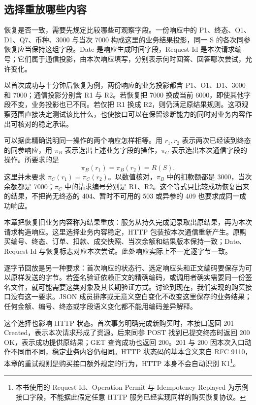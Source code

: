 \subsection*{选择重放哪些内容}

恢复是否一致，需要先规定比较哪些可观察字段。一份响应中的 P1、终态、O1、D1、Q7、币种、3000 与当次 7000 构成这里的业务结果投影，同一 S 的各次同参恢复应当保持这组字段。Date 是响应生成时间字段，Request-Id 是本次请求编号；它们属于通信投影，由本次响应填写，分别表示何时回答、回答哪次尝试，允许变化。

以首次成功与十分钟后恢复为例，两份响应的业务投影都含 P1、O1、D1、3000 和 7000；通信投影分别含 R1 与 R2。若恢复把 7000 换成当前 6000，即使其他字段不变，业务投影也已不同。若仅把 R1 换成 R2，则仍满足原结果规则。这项观察范围直接决定测试该比什么，也使接口可以在保留诊断能力的同时对业务内容作出可核对的稳定承诺。



可以据此精确说明同一操作的两个响应怎样相等。用 \(r_1,r_2\) 表示两次已经读到终态的同参响应，用 \(\pi_B\) 表示选出上述业务字段的操作，\(\pi_C\) 表示选出本次通信字段的操作。所要求的是
\[
 \pi_B(r_1)=\pi_B(r_2)=R(S).
\]
这里并未要求 \(\pi_C(r_1)=\pi_C(r_2)\)。以数值核对，\(\pi_B\) 中的扣款额都是 3000，当次余额都是 7000；\(\pi_C\) 中的请求编号分别是 R1、R2。这个等式只比较成功恢复出来的结果，不把尚无终态的 404、暂时不可用的 503 或异参的 409 也要求成同一成功响应。

本章把恢复旧业务内容称为结果重放：服务从持久完成记录取出原结果，再为本次请求构造响应。这里选择业务内容稳定，HTTP 包装按本次通信重新产生。原购买编号、终态、订单、扣款、成交快照、当次余额和结果版本保持一致；Date、Request-Id 与恢复标志对应本次尝试。此处响应实际上不一定逐字节一致。

逐字节回放是另一种要求：首次响应的状态行、选定响应头和正文编码要保存为可以原样发送的字节。若签名验证依赖正文的精确编码，或调用者确实需要同一份签名文件，就可能需要这类对象及其长期验证方式。讨论到现在，我们实现的购买接口没有这一要求。JSON 成员排序或无意义空白变化不改变这里保存的业务结果；任何金额、编号、终态或字段语义变化都不能用编码差异解释。

这个选择也影响 HTTP 状态。首次事务明确完成新购买时，本接口返回 201 Created，表示本次请求形成了资源。后来同参 POST 找到已提交终态时返回 200 OK，表示成功提供原结果；GET 查询成功也返回 200。201 与 200 因本次入口动作不同而不同，稳定业务内容仍相同。HTTP 状态码的基本含义来自 RFC 9110，本章的重试规则是购买接口额外规定的行为，HTTP 本身不会自动识别 K1\cite{http}\footnote{本书使用的 Request-Id、Operation-Permit 与 Idempotency-Replayed 为示例接口字段，不能据此假定任意 HTTP 服务已经实现同样的购买恢复协议。}。

